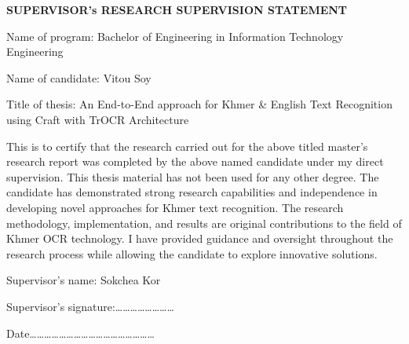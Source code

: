 
\begin{adjustwidth}{0.2cm}{0.2cm}


    \begin{center}
        {\englishfont\fontsize{14pt}{21pt}\selectfont \textbf{SUPERVISOR's RESEARCH SUPERVISION STATEMENT} \par}
    \end{center}
    \label{supervisor-statement}

    \vspace{1cm}
    
    \englishfont\large
    \begin{flushleft}
    Name of program: Bachelor of Engineering in Information Technology Engineering\par
    Name of candidate: Vitou Soy\par
    \end{flushleft}

    \vspace{1cm}
    
    \englishfont\large
    \begin{flushleft}
    Title of thesis: An End-to-End approach for Khmer \& English Text Recognition using Craft with TrOCR Architecture\par
    \end{flushleft}

    \vspace{1cm}
    \setlength{\parindent}{0pt}
    This is to certify that the research carried out for the above titled master's
    research report was completed by the above named candidate under my direct
    supervision. This thesis material has not been used for any other degree. The
    candidate has demonstrated strong research capabilities and independence in
    developing novel approaches for Khmer text recognition. The research
    methodology, implementation, and results are original contributions to the field
    of Khmer OCR technology. I have provided guidance and oversight throughout
    the research process while allowing the candidate to explore innovative
    solutions.\par

    \vspace{1cm}
    \begin{flushleft}
    Supervisor's name: Sokchea Kor\par
    \vspace{0.1cm}
    Supervisor's signature:……………………\par
    \vspace{0.1cm}
    Date……………………………………………\par
    \end{flushleft}

\end{adjustwidth}